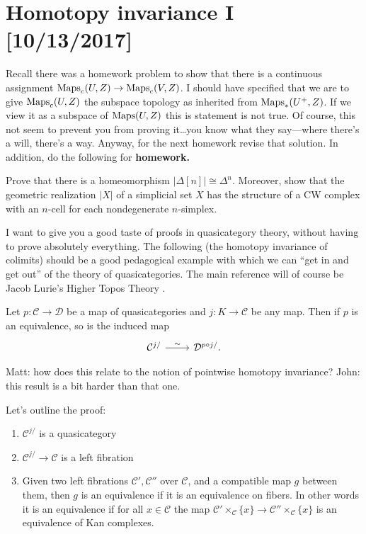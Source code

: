 \documentclass{amsart}
\begin{document}
\newpage

\section{Homotopy invariance I [10/13/2017]}

Recall there was a homework problem to show that there is a continuous assignment $\operatorname{Maps}_c(U,Z)\to\operatorname{Maps}_c(V,Z)$.
I should have specified that we are to give $\operatorname{Maps}_c(U,Z)$ the subspace topology as inherited from $\operatorname{Maps}_*(U^+,Z)$.
If we view it as a subspace of $\operatorname{Maps}(U,Z)$ this is statement is not true.
Of course, this not seem to prevent you from proving it\ldots you know what they say---where there's
a will, there's a way.
Anyway, for the next homework revise that solution.
In addition, do the following for \textbf{homework.}

\begin{exercise}
    Prove that there is a homeomorphism $|\Delta[n]|\cong\Delta^n$. Moreover, show that
    the geometric realization $|X|$ of a simplicial set $X$ has the structure of a CW
    complex with an $n$-cell for each nondegenerate $n$-simplex.
\end{exercise}

I want to give you a good taste of proofs in quasicategory theory, without having
to prove absolutely everything. The following (the homotopy invariance of colimits)
should be a good pedagogical example
with which we can ``get in and get out'' of the theory of quasicategories. The main
reference will of course be Jacob Lurie's Higher Topos Theory \cite{lurie}.
\begin{proposition}
    Let $p:\mathcal{C}\to\mathcal{D}$ be a map of quasicategories and $j:K\to\mathcal{C}$
    be any map. Then if $p$ is an equivalence, so is the induced map
    \begin{equation*}
        \begin{tikzcd}
            \mathcal{C}^{j/} \rar{\sim} & \mathcal{D}^{p\circ j/}.
        \end{tikzcd}
    \end{equation*}
\end{proposition}
Matt: how does this relate to the notion of pointwise homotopy invariance?
John: this result is a bit harder than that one.

Let's outline the proof:
\begin{enumerate}
    \item $\mathcal{C}^{j/}$ is a quasicategory
    \item $\mathcal{C}^{j/}\to\mathcal{C}$ is a left fibration
    \item Given two left fibrations $\mathcal{C}', \mathcal{C}''$ over $\mathcal{C}$, 
        and a compatible map $g$ between them, then $g$ is an equivalence if it is
        an equivalence on fibers. In other words it is an equivalence if for all $x\in \mathcal{C}$
        the map $\mathcal{C}'\times_{\mathcal{C}}\{x\} \to \mathcal{C}''\times_\mathcal{C}\{x\}$ is
        an equivalence of Kan complexes.
\end{enumerate}
\end{document}
